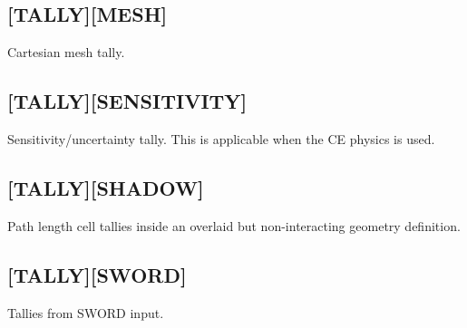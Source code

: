 \documentclass[10pt]{article}
\begin{document}
\subsection{[TALLY][MESH]}
Cartesian mesh tally. 

\subsection{[TALLY][SENSITIVITY]}
Sensitivity/uncertainty tally. This is applicable when the CE physics is used. 

\subsection{[TALLY][SHADOW]}
Path length cell tallies inside an overlaid but non-interacting geometry definition. 

\subsection{[TALLY][SWORD]}
Tallies from SWORD input. 
\end{document}
